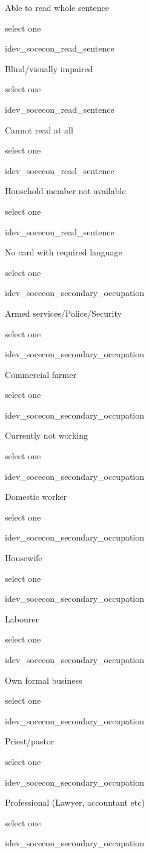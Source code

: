 \documentclass[]{article}
\begin{document}
Able to read whole sentence

select one

idev\_socecon\_read\_sentence

Blind/visually impaired

select one

idev\_socecon\_read\_sentence

Cannot read at all

select one

idev\_socecon\_read\_sentence

Household member not available

select one

idev\_socecon\_read\_sentence

No card with required language

select one

idev\_socecon\_secondary\_occupation

Armed services/Police/Security

select one

idev\_socecon\_secondary\_occupation

Commercial farmer

select one

idev\_socecon\_secondary\_occupation

Currently not working

select one

idev\_socecon\_secondary\_occupation

Domestic worker

select one

idev\_socecon\_secondary\_occupation

Housewife

select one

idev\_socecon\_secondary\_occupation

Labourer

select one

idev\_socecon\_secondary\_occupation

Own formal business

select one

idev\_socecon\_secondary\_occupation

Priest/pastor

select one

idev\_socecon\_secondary\_occupation

Professional (Lawyer, accountant etc)

select one

idev\_socecon\_secondary\_occupation
\end{document}
